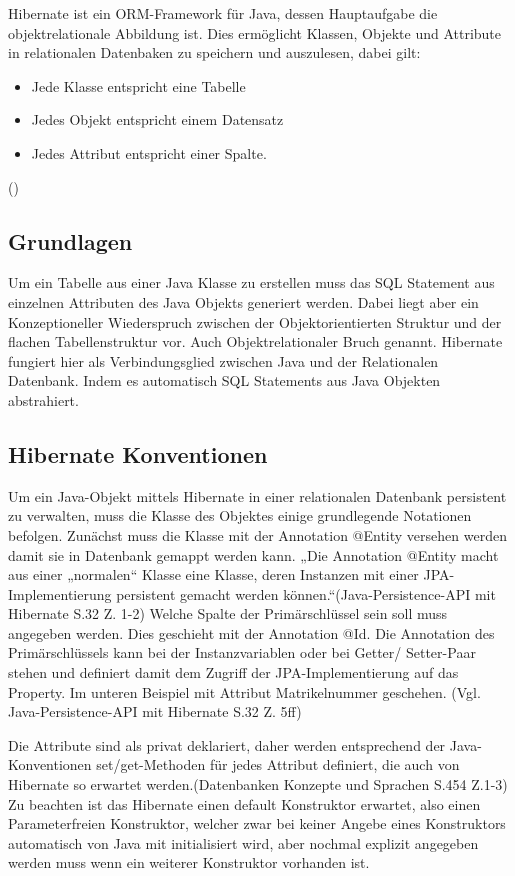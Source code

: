 Hibernate ist ein ORM-Framework für Java, dessen Hauptaufgabe die objektrelationale Abbildung ist. Dies ermöglicht Klassen, Objekte und Attribute in relationalen Datenbaken zu speichern und auszulesen, dabei gilt:

\begin{itemize}
	\item Jede Klasse entspricht eine Tabelle
	\item Jedes Objekt entspricht einem Datensatz
	\item Jedes Attribut entspricht einer Spalte.
\end{itemize}
(\cite[S. 280]{Piep1})

\subsection{Grundlagen}

Um ein Tabelle aus einer Java Klasse zu erstellen muss das SQL Statement aus einzelnen Attributen des Java Objekts generiert werden. Dabei liegt aber ein Konzeptioneller Wiederspruch zwischen der Objektorientierten Struktur und der flachen Tabellenstruktur vor. Auch Objektrelationaler Bruch genannt. Hibernate fungiert hier als Verbindungsglied zwischen Java und der Relationalen Datenbank. Indem es automatisch SQL Statements aus Java Objekten abstrahiert.


\subsection{Hibernate Konventionen}

Um ein Java-Objekt mittels Hibernate in einer relationalen Datenbank persistent zu verwalten, muss die Klasse des Objektes einige grundlegende Notationen befolgen. Zunächst muss die Klasse mit der Annotation @Entity versehen werden damit sie in Datenbank gemappt werden kann. „Die Annotation @Entity macht aus einer „normalen“ Klasse eine Klasse, deren Instanzen mit einer JPA-Implementierung persistent gemacht werden können.“(Java-Persistence-API mit Hibernate S.32 Z. 1-2) Welche Spalte der Primärschlüssel sein soll muss angegeben werden. Dies geschieht mit der Annotation @Id. Die Annotation des Primärschlüssels kann bei der Instanzvariablen oder bei Getter/ Setter-Paar stehen und definiert damit dem Zugriff der JPA-Implementierung auf das Property. Im unteren Beispiel mit Attribut Matrikelnummer geschehen. (Vgl. Java-Persistence-API mit Hibernate S.32 Z. 5ff)

Die Attribute sind als privat deklariert, daher werden entsprechend der Java-Konventionen set/get-Methoden für jedes Attribut definiert, die auch von Hibernate so erwartet werden.(Datenbanken Konzepte und Sprachen S.454 Z.1-3) Zu beachten ist das Hibernate einen default Konstruktor erwartet, also einen Parameterfreien Konstruktor, welcher zwar bei keiner Angebe eines Konstruktors automatisch von Java mit initialisiert wird, aber nochmal explizit angegeben werden muss wenn ein weiterer Konstruktor vorhanden ist.

